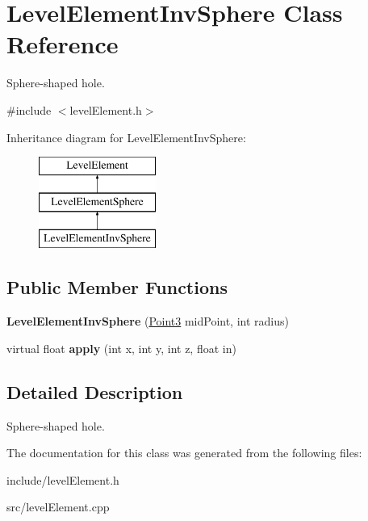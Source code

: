 \hypertarget{classLevelElementInvSphere}{
\section{\-Level\-Element\-Inv\-Sphere \-Class \-Reference}
\label{da/dd1/classLevelElementInvSphere}
}


\-Sphere-\/shaped hole.  




{\ttfamily \#include $<$level\-Element.\-h$>$}

\-Inheritance diagram for \-Level\-Element\-Inv\-Sphere\-:\begin{figure}[H]
\begin{center}
\leavevmode
\includegraphics[height=3.000000cm]{da/dd1/classLevelElementInvSphere}
\end{center}
\end{figure}
\subsection*{\-Public \-Member \-Functions}
\begin{DoxyCompactItemize}
\item 
\hypertarget{classLevelElementInvSphere_a9fefb997ffdb9cd577ba62e94b910c12}{
{\bfseries \-Level\-Element\-Inv\-Sphere} (\hyperlink{classPoint3}{\-Point3} mid\-Point, int radius)}
\label{da/dd1/classLevelElementInvSphere_a9fefb997ffdb9cd577ba62e94b910c12}

\item 
\hypertarget{classLevelElementInvSphere_a741f19839df4687b93bbb797bb410b56}{
virtual float {\bfseries apply} (int x, int y, int z, float in)}
\label{da/dd1/classLevelElementInvSphere_a741f19839df4687b93bbb797bb410b56}

\end{DoxyCompactItemize}


\subsection{\-Detailed \-Description}
\-Sphere-\/shaped hole. 

\-The documentation for this class was generated from the following files\-:\begin{DoxyCompactItemize}
\item 
include/level\-Element.\-h\item 
src/level\-Element.\-cpp\end{DoxyCompactItemize}
